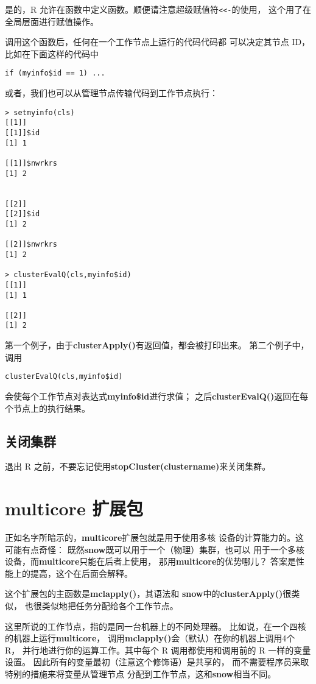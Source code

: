 是的，R 允许在函数中定义函数。顺便请注意超级赋值符\verb#<<-#的使用，
这个用了在全局层面进行赋值操作。

调用这个函数后，任何在一个工作节点上运行的代码代码都
可以决定其节点 ID，比如在下面这样的代码中

\begin{lstlisting}
if (myinfo$id == 1) ...
\end{lstlisting}

或者，我们也可以从管理节点传输代码到工作节点执行：

\begin{lstlisting}
> setmyinfo(cls)
[[1]]
[[1]]$id
[1] 1

[[1]]$nwrkrs
[1] 2


[[2]]
[[2]]$id
[1] 2

[[2]]$nwrkrs
[1] 2

> clusterEvalQ(cls,myinfo$id)
[[1]]
[1] 1

[[2]]
[1] 2
\end{lstlisting}

第一个例子，由于{\bf clusterApply()}有返回值，都会被打印出来。
第二个例子中，调用
\begin{lstlisting}
clusterEvalQ(cls,myinfo$id)
\end{lstlisting}
会使每个工作节点对表达式\textbf{myinfo\$id}进行求值；
之后{\bf clusterEvalQ()}返回在每个节点上的执行结果。

\subsection{关闭集群}

退出 R 之前，不要忘记使用{\bf stopCluster(clustername)}来关闭集群。

\section{multicore 扩展包}

正如名字所暗示的，{\bf multicore}扩展包就是用于使用多核
设备的计算能力的。这可能有点奇怪：
既然{\bf snow}既可以用于一个（物理）集群，也可以
用于一个多核设备，而{\bf multicore}只能在后者上使用，
那用{\bf multicore}的优势哪儿？
答案是性能上的提高，这个在后面会解释。

这个扩展包的主函数是{\bf mclapply()}，其语法和
{\bf snow}中的{\bf clusterApply()}很类似，
也很类似地把任务分配给各个工作节点。

这里所说的工作节点，指的是同一台机器上的不同处理器。
比如说，在一个四核的机器上运行{\bf multicore}，
调用{\bf mclapply()}会（默认）在你的机器上调用4个 R，
并行地进行你的运算工作。其中每个 R 调用都使用和调用前的 R 一样的变量设置。
因此所有的变量最初（注意这个修饰语）是共享的，
而不需要程序员采取特别的措施来将变量从管理节点
分配到工作节点，这和{\bf snow}相当不同。

